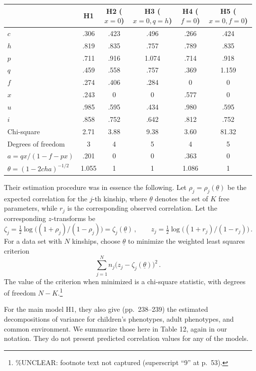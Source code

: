 ﻿\documentclass[12pt]{article}
\begin{document}
\begin{center}
\small
\begin{tabular}{l c c c c c}
\hline
 & H1 & H2 ($x=0$) & H3 ($x=0,q=h$) & H4 ($f=0$) & H5 ($x=0,f=0$) \\
\hline
$c$ & .306 & .423 & .496 & .266 & .424 \\
$h$ & .819 & .835 & .757 & .789 & .835 \\
$p$ & .711 & .916 & 1.074 & .714 & .918 \\
$q$ & .459 & .558 & .757 & .369 & 1.159 \\
$f$ & .274 & .406 & .284 & 0 & 0 \\
$x$ & .243 & 0 & 0 & .577 & 0 \\
$u$ & .985 & .595 & .434 & .980 & .595 \\
$i$ & .858 & .752 & .642 & .812 & .752 \\
Chi-square & 2.71 & 3.88 & 9.38 & 3.60 & 81.32 \\
Degrees of freedom & 3 & 4 & 5 & 4 & 5 \\
$a=qx/(1-f-px)$ & .201 & 0 & 0 & .363 & 0 \\
$\theta=(1-2cha)^{-1/2}$ & 1.055 & 1 & 1 & 1.086 & 1 \\
\hline
\end{tabular}
\end{center}

Their estimation procedure was in essence the following. Let $\rho_j=\rho_j(\underline\theta)$ be the expected correlation for the $j$-th kinship, where $\underline\theta$ denotes the set of $K$ free parameters, while $r_j$ is the corresponding observed correlation. Let the corresponding $z$-transforms be
\begin{equation*}
\zeta_j = \tfrac12\log\big((1+\rho_j)/(1-\rho_j)\big) = \zeta_j(\underline\theta) \, , \qquad z_j = \tfrac12\log\big((1+r_j)/(1-r_j)\big) \, .
\end{equation*}
For a data set with $N$ kinships, choose $\underline\theta$ to minimize the weighted least squares criterion
\begin{equation*}
\sum_{j=1}^{N} n_j\big(z_j - \zeta_j(\underline\theta)\big)^2 \, .
\end{equation*}
The value of the criterion when minimized is a chi-square statistic, with degrees of freedom $N-K$.\footnote{\%UNCLEAR: footnote text not captured (superscript ``9'' at p.\ 53).}

For the main model H1, they also give (pp.\ 238--239) the estimated decompositions of variance for children's phenotypes, adult phenotypes, and common environment. We summarize those here in Table 12, again in our notation. They do not present predicted correlation values for any of the models.
\end{document}
